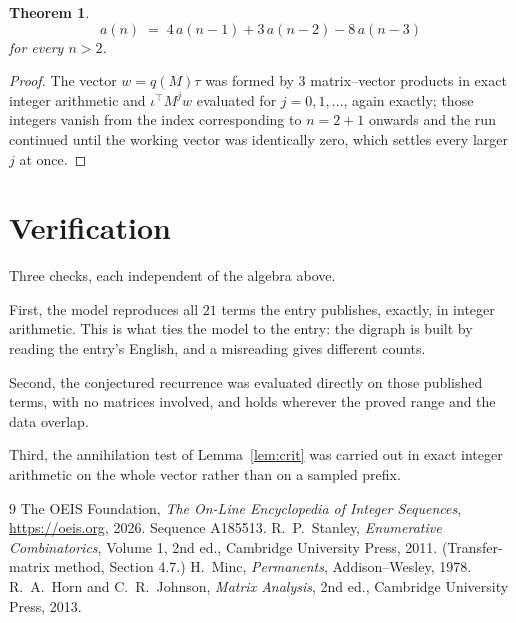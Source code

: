 \documentclass[11pt,a4paper]{article}
\theoremstyle{plain}
\newtheorem{theorem}{Theorem}
\theoremstyle{definition}
\begin{document}
\begin{theorem}
\[
a(n)\;=\;4\,a(n-1) + 3\,a(n-2) - 8\,a(n-3)
\]
for every $n>2$.
\end{theorem}

\begin{proof}
The vector $w=q(M)\tau$ was formed by $3$ matrix--vector products in exact integer
arithmetic and $\iota^{\!\top}M^{j}w$ evaluated for $j=0,1,\dots$, again exactly; those
integers vanish from the index corresponding to $n=2+1$ onwards and the run continued
until the working vector was identically zero, which settles every larger $j$ at once.
\end{proof}

\section{Verification}

Three checks, each independent of the algebra above.

First, the model reproduces all $21$ terms the entry publishes, exactly, in integer
arithmetic. This is what ties the model to the entry: the digraph is built by reading the
entry's English, and a misreading gives different counts.

Second, the conjectured recurrence was evaluated directly on those published terms, with no
matrices involved, and holds wherever the proved range and the data overlap.

Third, the annihilation test of Lemma~\ref{lem:crit} was carried out in exact integer
arithmetic on the whole vector rather than on a sampled prefix.

\begin{thebibliography}{9}
 The OEIS Foundation, \emph{The On-Line Encyclopedia of Integer
Sequences}, \url{https://oeis.org}, 2026. Sequence A185513.
 R.~P.~Stanley, \emph{Enumerative Combinatorics}, Volume 1, 2nd ed.,
Cambridge University Press, 2011. (Transfer-matrix method, Section 4.7.)
 H.~Minc, \emph{Permanents}, Addison--Wesley, 1978.
 R.~A.~Horn and C.~R.~Johnson, \emph{Matrix Analysis}, 2nd ed., Cambridge
University Press, 2013.
\end{thebibliography}
\end{document}
